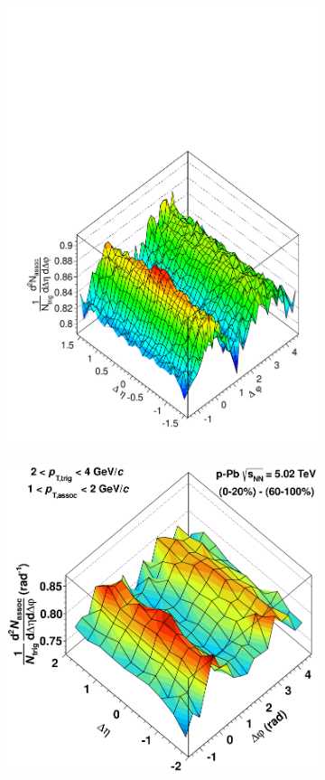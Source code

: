 \begin{figure}
  \centering
  \begin{subfigure}[b]{0.5\textwidth}
    \includegraphics[width=\textwidth]{figures/subtraction_12_24_nothresh.pdf}
  \end{subfigure}%
  \begin{subfigure}[b]{0.5\textwidth}
    \includegraphics[width=\textwidth]{figures/figures_ALICE_paper/subtraction_plot.png}

\end{subfigure}
\end{figure}
